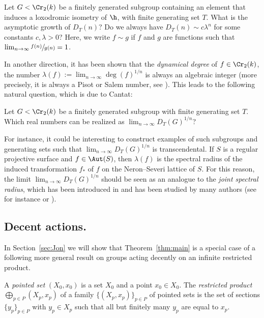 \begin{question}
Let $G<\Cr_2(k)$ be a finitely generated subgroup containing an element that induces a loxodromic isometry of $\h$, with finite generating set $T$. What is the asymptotic growth of $D_T(n)$? Do we always have $D_T(n)\sim c\lambda^n$ for some constants $c,\lambda>0$? Here, we write $f\sim g$ if $f$ and $g$ are functions such that $\lim_{n\to\infty} \sfrac{f(n)}{g(n)}=1$.

\end{question}

In another direction, it has been shown that the \emph{dynamical degree} of $f\in\Cr_2(k)$, \ie the number $\lambda(f):=\lim_{n\to\infty}\deg(f)^{1/n}$ is always an algebraic integer (more precisely, it is always a Pisot or Salem number, see \cite{blanc2016dynamical}). This leads to the following natural question, which is due to Cantat:

\begin{question}
Let $G<\Cr_2(k)$ be a finitely generated subgroup with finite generating set $T$. Which real numbers can be realized as $\lim_{n\to\infty}D_T(G)^{1/n}$?
\end{question}

For instance, it could be interesting to construct examples of such subgroups and generating sets such that $\lim_{n\to\infty}D_T(G)^{1/n}$ is transcendental. If $S$ is a {regular} projective surface and $f\in\Aut(S)$, then $\lambda(f)$ is the spectral radius of the induced transformation $f_*$ of $f$ on the Neron--Severi lattice of $S$. For this reason, the limit $\lim_{n\to\infty}D_T(G)^{1/n}$ should be seen as an analogue to the \emph{joint spectral radius}, which has been introduced in \cite{rota1960note} and has been studied by many authors (see for instance \cite{jungers2009joint} or \cite{breuillard2021joint}).

\subsection{Decent actions.}
In Section~\ref{sec:Jon} we will show that Theorem~\ref{thm:main} is a special case of a following more general result on groups acting decently on an infinite restricted product.

\label{sum}
A \emph{pointed set} $(X_0,x_0)$ is a set $X_0$ and a point $x_0\in X_0$. The \emph{restricted product} $\bigoplus_{p\in P} (X_p,x_p)$ of a family $\{(X_p,x_p)\}_{p\in P}$ of pointed sets is the set of sections $\{y_p\}_{p\in P}$ with $y_p\in X_p$ such that all but finitely many $y_p$ are equal to $x_p$.

